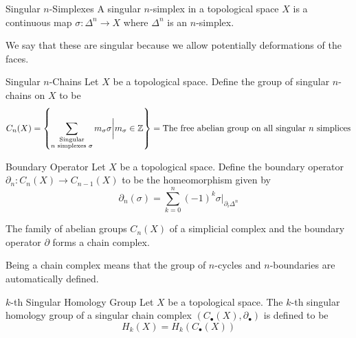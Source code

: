 \documentclass[a4paper]{article}
\begin{document}
\begin{defn}{Singular $n$-Simplexes}{} A singular $n$-simplex in a topological space $X$ is a continuous map $\sigma:\Delta^n\to X$ where $\Delta^n$ is an $n$-simplex. 
\end{defn}

We say that these are singular because we allow potentially deformations of the faces. 

\begin{defn}{Singular $n$-Chains}{} Let $X$ be a topological space. Define the group of singular $n$-chains on $X$ to be $$C_n(X)=\left\{\sum_{\substack{\text{Singular} \\ n \text{ simplexes } \sigma}}m_\sigma\sigma\bigg{|}m_\sigma\in\mathbb{Z}\right\}=\text{The free abelian group on all singular $n$ simplices}$$
\end{defn}

\begin{defn}{Boundary Operator}{} Let $X$ be a topological space. Define the boundary operator $\partial_n:C_n(X)\to C_{n-1}(X)$ to be the homeomorphism given by $$\partial_n(\sigma)=\sum_{k=0}^n(-1)^k\sigma|_{\partial_i\Delta^n}$$
\end{defn}

\begin{prp}{}{} The family of abelian groups $C_n(X)$ of a simplicial complex and the boundary operator $\partial$ forms a chain complex. 
\end{prp}

Being a chain complex means that the group of $n$-cycles and $n$-boundaries are automatically defined. 

\begin{defn}{$k$-th Singular Homology Group}{} Let $X$ be a topological space. The $k$-th singular homology group of a singular chain complex $(C_\bullet(X),\partial_\bullet)$ is defined to be $$H_k(X)=H_k(C_\bullet(X))$$
\end{defn}
\end{document}
